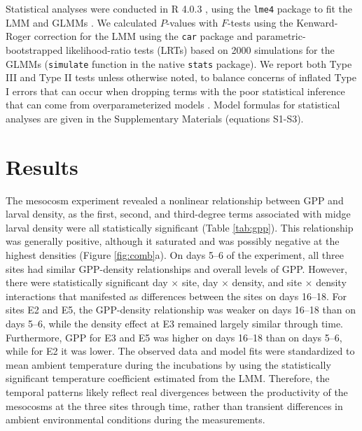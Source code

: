 \documentclass[12pt]{article}
\begin{document}
Statistical analyses were conducted in R 4.0.3 \citep{r2020},
using the \texttt{lme4} package to fit the LMM and GLMMs \citep{lme4}.
We calculated $\textit{P}$-values with $\textit{F}$-tests using
the Kenward-Roger correction for the LMM \citep{halekoh2014kenward} 
using the \texttt{car} package \citep {fox2019}
and parametric-bootstrapped likelihood-ratio tests (LRTs) based on 2000 simulations
for the GLMMs (\texttt{simulate} function in the native \texttt{stats} package).
We report both Type III and Type II tests unless otherwise noted,
to balance concerns of inflated Type I errors that can occur when dropping 
terms with the poor statistical inference that can come from overparameterized models
\citep{zuur2009}.
Model formulas for statistical analyses are given in the Supplementary Materials
(equations S1-S3).






\section*{Results}

The mesocosm experiment revealed a nonlinear relationship between GPP and larval density,
as the first, second, and third-degree terms associated with midge larval density 
were all statistically significant (Table \ref{tab:gpp}). 
This relationship was generally positive, 
although it saturated 
and was possibly negative at the highest densities (Figure \ref{fig:comb}a).
On days 5--6 of the experiment, 
all three sites had similar GPP-density relationships and overall levels of GPP.
However, there were statistically significant day $\times$ site, day $\times$ density,
and site $\times$ density interactions that manifested as differences
between the sites on days 16--18.
For sites E2 and E5, the GPP-density relationship was weaker 
on days 16--18 than on days 5--6, 
while the density effect at E3 remained largely similar through time.
Furthermore, GPP for E3 and E5 was higher on days 16--18 than on days 5--6, 
while for E2 it was lower.
The observed data and model fits were standardized to mean ambient temperature 
during the incubations by using the statistically significant temperature coefficient 
estimated from the LMM. 
Therefore, the temporal patterns likely reflect real divergences 
between the productivity of the mesocosms at the three sites through time, 
rather than transient differences in ambient environmental conditions 
during the measurements.
\end{document}
